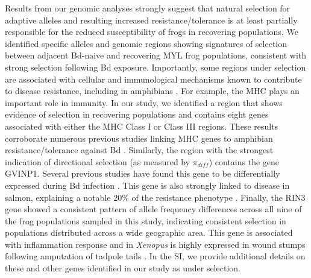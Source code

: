 \documentclass[9pt,twocolumn,twoside,lineno]{pnas-new}
\begin{document}
Results from our genomic analyses strongly suggest that natural
selection for adaptive alleles and resulting increased
resistance/tolerance is at least partially responsible for the reduced
susceptibility of frogs in recovering populations. We identified
specific alleles and genomic regions showing signatures of selection
between adjacent Bd-naive and recovering MYL frog populations,
consistent with strong selection following Bd exposure. Importantly,
some regions under selection are associated with cellular and
immunological mechanisms known to contribute to disease resistance,
including in amphibians \citep{zamudio2020}. For example, the MHC plays
an important role in immunity. In our study, we identified a region that
shows evidence of selection in recovering populations and contains eight
genes associated with either the MHC Class I or Class III regions. These
results corroborate numerous previous studies linking MHC genes to
amphibian resistance/tolerance against Bd
\citep[e.g.,][]{savage2011, bataille2015}. Similarly, the region with
the strongest indication of directional selection (as measured by
\(\pi_{diff}\)) contains the gene GVINP1. Several previous studies have
found this gene to be differentially expressed during Bd infection
\citep[e.g.,][]{grogan2018, ellison2014}. This gene is also strongly
linked to disease in salmon, explaining a notable 20\% of the resistance
phenotype \citep{robledo2020, robledo2018}. Finally, the RIN3 gene
showed a consistent pattern of allele frequency differences across all
nine of the frog populations sampled in this study, indicating
consistent selection in populations distributed across a wide geographic
area. This gene is associated with inflammation response and in
\emph{Xenopus} is highly expressed in wound stumps following amputation
of tadpole tails \citep{fukazawa2009}. In the SI, we provide additional
details on these and other genes identified in our study as under
selection.
\end{document}
